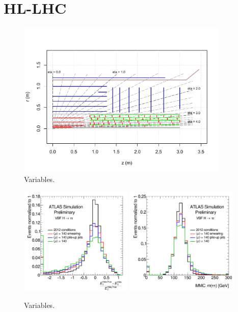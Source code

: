 \section{HL-LHC}
\label{sec:prospects-hllhc}

\begin{figure}[tp]
  \centering
  \includegraphics[width=0.90\textwidth]{figures/PLOT-UPGRADE-2014-001/fig_08.pdf}
  \caption{Variables.}
  \label{fig:prospects-hllhc-layout}
\end{figure}

\begin{figure}[tp]
  \centering
  \includegraphics[width=0.48\textwidth]{figures/ATL-PHYS-PUB-2014-018/fig_01a}
  \includegraphics[width=0.48\textwidth]{figures/ATL-PHYS-PUB-2014-018/fig_01b}
  \caption{Variables.}
  \label{fig:prospects-hllhc-degradation}
\end{figure}


